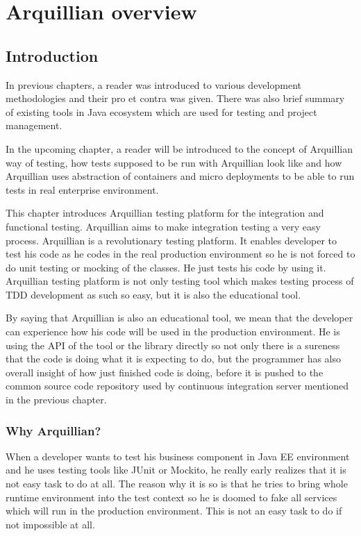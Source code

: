 \documentclass[12pt,final,oneside]{fithesis}
\begin{document}
\chapter{Arquillian overview}

	\section{Introduction}

In previous chapters, a reader was introduced to various development methodologies and their pro et contra was given. There was also brief summary of existing tools in Java ecosystem which are used for testing and project management.

In the upcoming chapter, a reader will be introduced to the concept of Arquillian way of testing, how tests supposed to be run with Arquillian look like and how Arquillian uses abstraction of containers and micro deployments to be able to run tests in real enterprise environment.

This chapter introduces Arquillian testing platform for the integration and functional testing. Arquillian aims to make integration testing a very easy process. Arquillian is a revolutionary testing platform. It enables developer to test his code as he codes in the real production environment so he is not forced to do unit testing or mocking of the classes. He just tests his code by using it. Arquillian testing platform is not only testing tool which makes testing process of TDD development as such so easy, but it is also the educational tool.

By saying that Arquillian is also an educational tool, we mean that the developer can experience how his code will be used in the production environment. He is using the API of the tool or the library directly so not only there is a sureness that the code is doing what it is expecting to do, but the programmer has also overall insight of how just finished code is doing, before it is pushed to the common source code repository used by continuous integration server mentioned in the previous chapter.


	\subsection{Why Arquillian?}

When a developer wants to test his business component in Java EE environment and he uses testing tools like JUnit or Mockito, he really early realizes that it is not easy task to do at all. The reason why it is so is that he tries to bring whole runtime environment into the test context so he is doomed to fake all services which will run in the production environment. This is not an easy task to do if not impossible at all.
\end{document}
